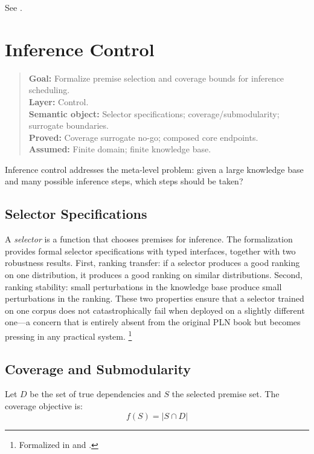 \documentclass[11pt,openany]{report}
\begin{document}
See .


\chapter{Inference Control}
\label{ch:inference-control}

\begin{quote}\small
\textbf{Goal:} Formalize premise selection and coverage bounds for inference scheduling.\\
\textbf{Layer:} Control.\\
\textbf{Semantic object:} Selector specifications; coverage/submodularity; surrogate boundaries.\\
\textbf{Proved:} Coverage surrogate no-go; composed core endpoints.\\
\textbf{Assumed:} Finite domain; finite knowledge base.
\end{quote}

Inference control addresses the meta-level problem: given a large knowledge
base and many possible inference steps, which steps should be taken?

\section{Selector Specifications}

A \emph{selector} is a function that chooses premises for inference.
The formalization provides formal selector specifications with typed
interfaces, together with two robustness results.  First, ranking
transfer: if a selector produces a good ranking on one distribution, it
produces a good ranking on similar distributions.  Second, ranking
stability: small perturbations in the knowledge base produce small
perturbations in the ranking.  These two properties ensure that a
selector trained on one corpus does not catastrophically fail when
deployed on a slightly different one---a concern that is entirely absent
from the original PLN book but becomes pressing in any practical system.%
\footnote{Formalized in  and
  .}

\section{Coverage and Submodularity}

Let $D$ be the set of true dependencies and $S$ the selected premise set.
The coverage objective is:
\[
  f(S) = |S \cap D|
\]
\end{document}
